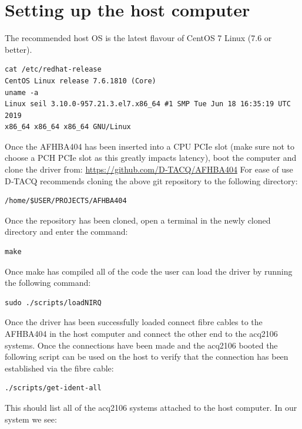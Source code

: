 \documentclass{article}
\begin{document}
\section{Setting up the host computer}
The recommended host OS is the latest flavour of CentOS 7 Linux (7.6 or better).

\begin{verbatim}
cat /etc/redhat-release 
CentOS Linux release 7.6.1810 (Core) 
uname -a
Linux seil 3.10.0-957.21.3.el7.x86_64 #1 SMP Tue Jun 18 16:35:19 UTC 2019
x86_64 x86_64 x86_64 GNU/Linux
\end{verbatim}

Once the AFHBA404 has been inserted into a CPU PCIe slot (make sure not to choose a PCH PCIe slot as this greatly impacts latency), boot the computer and clone the driver from:
\newline
\href{https://github.com/D-TACQ/AFHBA404}{https://github.com/D‑TACQ/AFHBA404}
\newline
For ease of use D‑TACQ  recommends cloning the above git repository to the following directory:

\begin{verbatim}
/home/$USER/PROJECTS/AFHBA404
\end{verbatim}

Once the repository has been cloned, open a terminal in the newly cloned directory and enter the command:

\begin{verbatim}
make
\end{verbatim}

Once make has compiled all of the code the user can load the driver by running the following command:

\begin{verbatim}
sudo ./scripts/loadNIRQ
\end{verbatim}

Once the driver has been successfully loaded connect fibre cables to the AFHBA404 in the host computer and connect the other end to the acq2106 systems.
Once the connections have been made and the acq2106 booted the following script can be used on the host to verify that the connection has been established via the fibre cable:

\begin{verbatim}
./scripts/get-ident-all
\end{verbatim}

This should list all of the acq2106 systems attached to the host computer. In our system we see:
\end{document}
